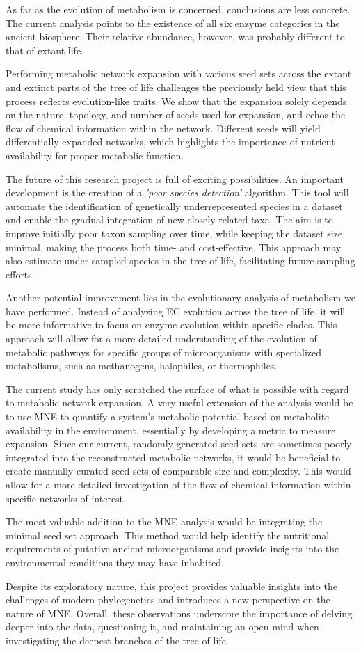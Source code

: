 As far as the evolution of metabolism is concerned, conclusions are less concrete. The current analysis points to the existence of all six enzyme categories in the ancient biosphere. Their relative abundance, however, was probably different to that of extant life.

Performing metabolic network expansion with various seed sets across the extant and extinct parts of the tree of life challenges the previously held view that this process reflects evolution-like traits. We show that the expansion solely depends on the nature, topology, and number of seeds used for expansion, and echos the flow of chemical information within the network. Different seeds will yield differentially expanded networks, which highlights the importance of nutrient availability for proper metabolic function. 

The future of this research project is full of exciting possibilities. An important development is the creation of a \textit{'poor species detection'} algorithm. This tool will automate the identification of genetically underrepresented species in a dataset and enable the gradual integration of new closely-related taxa. The aim is to improve initially poor taxon sampling over time, while keeping the dataset size minimal, making the process both time- and cost-effective. This approach may also estimate under-sampled species in the tree of life, facilitating future sampling efforts.

Another potential improvement lies in the evolutionary analysis of metabolism we have performed. Instead of analyzing EC evolution across the tree of life, it will be more informative to focus on enzyme evolution within specific clades. This approach will allow for a more detailed understanding of the evolution of metabolic pathways for specific groups of microorganisms with specialized metabolisms, such as methanogens, halophiles, or thermophiles.

The current study has only scratched the surface of what is possible with regard to metabolic network expansion. A very useful extension of the analysis would be to use MNE to quantify a system's metabolic potential based on metabolite availability in the environment, essentially by developing a metric to measure expansion. Since our current, randomly generated seed sets are sometimes poorly integrated into the reconstructed metabolic networks, it would be beneficial to create manually curated seed sets of comparable size and complexity. This would allow for a more detailed investigation of the flow of chemical information within specific networks of interest. 

The most valuable addition to the MNE analysis would be integrating the minimal seed set approach. This method would help identify the nutritional requirements of putative ancient microorganisms and provide insights into the environmental conditions they may have inhabited.

Despite its exploratory nature, this project provides valuable insights into the challenges of modern phylogenetics and introduces a new perspective on the nature of MNE. Overall, these observations underscore the importance of delving deeper into the data, questioning it, and maintaining an open mind when investigating the deepest branches of the tree of life.